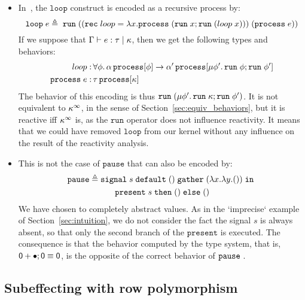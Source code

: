 \documentclass[9pt,preprint]{sigplanconf}
\newcommand{\deq}{\triangleq}
\begin{document}
\begin{itemize}
\item In~\cite{Mandel:2005}, the $\mathtt{loop}$ construct is encoded as a recursive process by:
%
\[
\eloop{e} \deq \mathid{run}(( \mathidl{rec} loop = 
     \elam{x}{\eproc{(\eseq{\erun{x}}{\erun{(\eapp{loop}{x})}})}})\; (\eproc{e})) 
\]
If we suppose that \mbox{$\Gamma \vdash e : \tau \mid \kappa$}, then we get the following types and behaviors:
%
\begin{align*}
loop:&\, \forall \phi.\, \alpha \,\mathtt{process}[\phi] \rightarrow \alpha' \,\mathtt{process}[\mu \phi'.\, \mathtt{run}\; \phi ; \mathtt{run}\; \phi']  \\
\mathtt{process}\; e :&\, \tau \,\mathtt{process}[\kappa]
\end{align*}
The behavior of this encoding is thus $\mathtt{run}\; (\mu \phi'.\, \mathtt{run}\; \kappa ; \mathtt{run}\; \phi')$. It is not equivalent to $\kappa^\infty$, in the sense of Section~\ref{sec:equiv_behaviors}, but it is reactive iff $\kappa^\infty$ is, as the $\mathtt{run}$ operator does not influence reactivity. It means that we could have removed $\mathtt{loop}$ from our kernel without any influence on the result of the reactivity analysis.

\item This is not the case of $\mathtt{pause}$ that can also be encoded by:
%
\begin{align*}
\mathtt{pause} \deq &\; \esig{s}{\evoid}{(\elam{x}{\elam{y}{\mathtt{\evoid}}})}
                                    { \\ &\qquad \epres{s}{\evoid}{\evoid}}
\end{align*}
%
We have chosen to completely abstract values. As in the `imprecise` example of Section~\ref{sec:intuition}, we do not consider the fact the signal $s$ is always absent, so that only the second branch of the $\mathtt{present}$ is executed. The consequence is that the behavior computed by the type system, that is, $\textsf{0} + \bullet ; \textsf{0} \equiv \textsf{0}$, is the opposite of the correct behavior of $\mathtt{pause}\;$.

\end{itemize}

\subsection{Subeffecting with row polymorphism}
\end{document}
